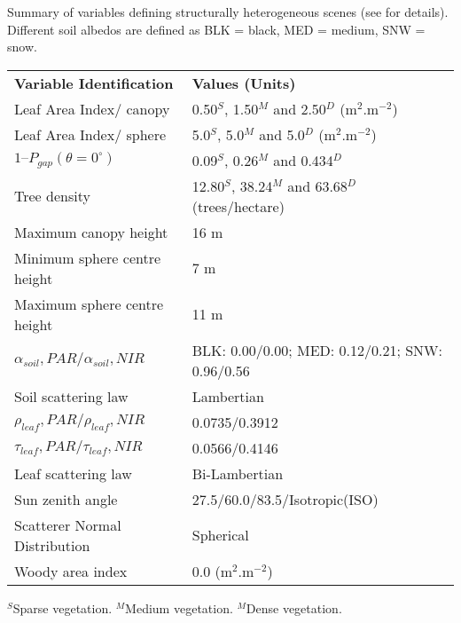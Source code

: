 \begin{threeparttable}
\centering
\caption{Summary of variables defining structurally heterogeneous scenes (see \citet{Widlowski2011} for details). Different soil albedos are defined as BLK = black, MED = medium, SNW = snow.}
\begin{tabular}{l{} l{}}
     \hline
     \hline
\textbf{Variable Identification}   & \textbf{Values (Units)}\\
\noalign{\smallskip}\hline
Leaf Area Index/ canopy	                & 0.50$^S$, 1.50$^M$ and 2.50$^D$ (m$^2$.m$^{-2}$)\\
Leaf Area Index/ sphere	                & 5.0$^S$, 5.0$^M$ and 5.0$^D$  (m$^2$.m$^{-2}$)\\
$1 – P_{gap} (\theta = 0^{\circ})$      & 0.09$^S$, 0.26$^M$ and 0.434$^D$\\
Tree density                            & 12.80$^S$, 38.24$^M$ and 63.68$^D$ (trees/hectare)\\
Maximum canopy height                   & 16 m\\
Minimum sphere centre height	        & 7 m\\
Maximum sphere centre height	        & 11 m\\
$\alpha_{soil},PAR / \alpha_{soil},NIR$	& BLK: 0.00/0.00; MED: 0.12/0.21; SNW: 0.96/0.56\\
Soil scattering law	                & Lambertian\\
$\rho_{leaf},PAR / \rho_{leaf},NIR$     & 0.0735/0.3912\\
$\tau_{leaf},PAR / \tau_{leaf},NIR$     & 0.0566/0.4146\\
Leaf scattering law                     & Bi-Lambertian\\
Sun zenith angle	                & 27.5/60.0/83.5/Isotropic(ISO)\\
Scatterer Normal Distribution           & Spherical\\
Woody area index                        & 0.0 (m$^2$.m$^{-2}$)\\
\hline
\hline%
\end{tabular}
\begin{tablenotes}
      \small
      \item $^S$Sparse vegetation. $^M$Medium vegetation. $^M$Dense vegetation. 
\end{tablenotes}
\label{tab:RAMI4PILPS}
\end{threeparttable}
\bigskip

